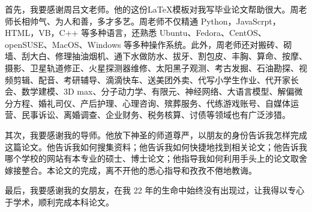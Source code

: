 \begin{acknowledgements}

首先，我要感谢周吕文老师。他的这份\LaTeX{}模板对我写毕业论文帮助很大。周老师长相帅气、为人和善，多才多艺。周老师不仅精通 Python，JavaScrpt，HTML，VB，C++ 等多种语言，还熟悉 Ubuntu、Fedora、CentOS、openSUSE、MacOS、Windows 等多种操作系统。此外，周老师还对搬砖、砌墙、刮大白、修理抽油烟机、通下水做防水、拔牙、割包皮、丰胸、算命、按摩、摄影、卫星轨道修正、火星探测器维修、太阳黑子观测、考古发掘、石油勘探、视频剪辑、配音、考研辅导、滴滴快车、送美团外卖、代写小学生作业、代开家长会、数学建模、3D max、分子动力学、有限元、神经网络、大语言模型、解偏微分方程、婚礼司仪、产后护理、心理咨询、殡葬服务、代练游戏账号、自媒体运营、民事诉讼、离婚调查、企业财务、税务核算、讨债等领域也有广泛涉猎。

其次，我要感谢我的导师。他放下神圣的师道尊严，以朋友的身份告诉我怎样完成这篇论文。他告诉我如何搜集资料；他告诉我如何快捷地找到相关论文；他告诉我哪个学校的网站有本专业的硕士、博士论文；他指导我如何利用手头上的论文取舍嫁接整合。本论文的完成，离不开他的悉心指导和孜孜不倦地教诲。

最后，我要感谢我的女朋友，在我 22 年的生命中始终没有出现过，让我得以专心于学术，顺利完成本科论文。
\end{acknowledgements}

